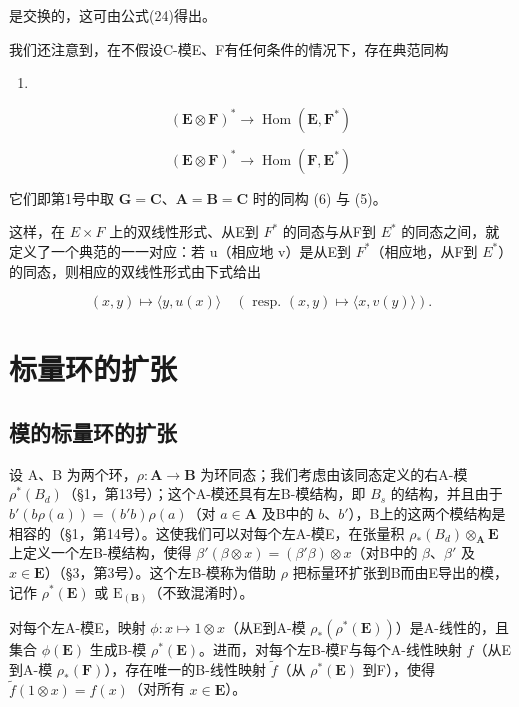 是交换的，这可由公式(24)得出。

我们还注意到，在不假设C-模E、F有任何条件的情况下，存在典范同构

\begin{enumerate}
\def\labelenumi{(\arabic{enumi})}
\setcounter{enumi}{27}
\tightlist
\item
\end{enumerate}

\[
(\mathbf {E} \otimes \mathbf {F}) ^ {*} \rightarrow \operatorname{Hom} (\mathbf {E}, \mathbf {F} ^ {*})\tag{29}
\]

\[
(\mathbf {E} \otimes \mathbf {F}) ^ {*} \rightarrow \operatorname{Hom} (\mathbf {F}, \mathbf {E} ^ {*})
\]

它们即第1号中取 \(\mathbf{G} = \mathbf{C}\)、\(\mathbf{A} = \mathbf{B} = \mathbf{C}\) 时的同构 (6) 与 (5)。

这样，在 \(E \times F\) 上的双线性形式、从E到 \(F^{*}\) 的同态与从F到 \(E^{*}\) 的同态之间，就定义了一个典范的一一对应：若 u（相应地 v）是从E到 \(F^{*}\)（相应地，从F到 \(E^{*}\)）的同态，则相应的双线性形式由下式给出

\[
(x, y) \mapsto \langle y, u (x) \rangle \quad (\text { resp. } (x, y) \mapsto \langle x, v (y) \rangle).
\]

\section{标量环的扩张}

\subsection{模的标量环的扩张}

设 A、B 为两个环，\(\rho: \mathbf{A} \to \mathbf{B}\) 为环同态；我们考虑由该同态定义的右A-模 \(\rho^{*}(B_{d})\)（§1，第13号）；这个A-模还具有左B-模结构，即 \(B_{s}\) 的结构，并且由于 \(b'(b\rho(a)) = (b'b)\rho(a)\)（对 \(a \in \mathbf{A}\) 及B中的 \(b\)、\(b'\)），B上的这两个模结构是相容的（§1，第14号）。这使我们可以对每个左A-模E，在张量积 \(\rho_{*}(B_{d}) \otimes_{\mathbf{A}} \mathbf{E}\) 上定义一个左B-模结构，使得 \(\beta'(\beta \otimes x) = (\beta'\beta) \otimes x\)（对B中的 \(\beta\)、\(\beta'\) 及 \(x \in \mathbf{E}\)）（§3，第3号）。这个左B-模称为借助 \(\rho\) 把标量环扩张到B而由E导出的模，记作 \(\rho^{*}(\mathbf{E})\) 或 \(\mathrm{E}_{(\mathbf{B})}\)（不致混淆时）。

对每个左A-模E，映射 \(\phi: x \mapsto 1 \otimes x\)（从E到A-模 \(\rho_*(\rho^*(\mathbf{E}))\)）是A-线性的，且集合 \(\phi(\mathbf{E})\) 生成B-模 \(\rho^*(\mathbf{E})\)。进而，对每个左B-模F与每个A-线性映射 \(f\)（从E到A-模 \(\rho_*(\mathbf{F})\)），存在唯一的B-线性映射 \(\tilde{f}\)（从 \(\rho^*(\mathbf{E})\) 到F），使得 \(\tilde{f}(1 \otimes x) = f(x)\)（对所有 \(x \in \mathbf{E}\)）。

